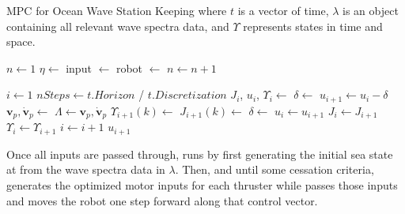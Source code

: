 \documentclass[letterpaper, 10pt, conference]{IEEEtran}
\renewcommand{\vec}[1]{\mathbf{#1}}
\begin{document}
\begin{algorithm}
\caption[caption]{MPC for Ocean Wave Station Keeping \hspace{\textwidth}where $t$ is a vector of time, $\lambda$ is an object containing all relevant wave spectra data, and $\Upsilon$ represents states in time and space.}
\label{alg:MPC}
\begin{algorithmic}[1]

 
\State $n\gets1$
\State $\eta \gets$ 
\State input $\gets$  
\State robot $\gets$  
\State $n \gets n+1$
\EndWhile
\EndProcedure

\State $i \gets 1$
\State $nSteps \gets t.Horizon$ / $t.Discretization$
\State $J_i$, $u_i$, $\Upsilon_i \gets$ 
\State $\delta \gets$  
\State $u_{i+1} \gets u_{i} - \delta$
\State $\vec{v}_p, \dot{\vec{v}}_p \gets$ 
\State $\Lambda \gets \vec{v}_p, \dot{\vec{v}}_p$
\State $\Upsilon_{i+1}(k) \gets$ 
\State $J_{i+1}(k) \gets$ 
\EndFor
\State $\delta \gets$ 
\State $u_i \gets u_{i+1}$
\State $J_i \gets J_{i+1}$
\State $\Upsilon_i \gets \Upsilon_{i+1}$
\State $i \gets i+1$
\EndWhile
\State \Return $u_{i+1}$
\EndFunction

\end{algorithmic}
\end{algorithm}

Once all inputs are passed through,  runs by first generating the initial sea state at  from the wave spectra data in $\lambda$. Then, and until some cessation criteria,  generates the optimized motor inputs for each thruster while  passes those inputs and moves the robot one step forward along that control vector. 
\end{document}
